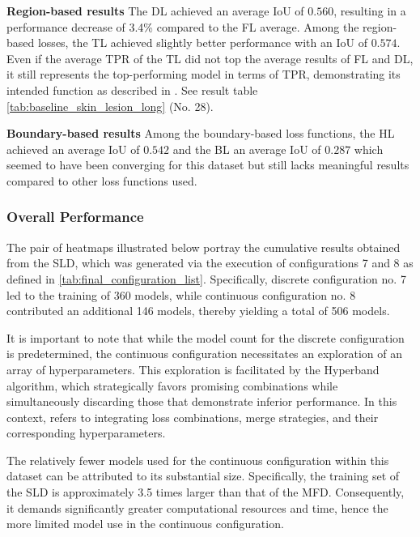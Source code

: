 \textbf{Region-based results}\newline
The \ac{DL} achieved an average \ac{IoU} of $0.560$, resulting in a performance decrease of 3.4\% compared to the \ac{FL} average. Among the region-based losses, the \ac{TL} achieved slightly better performance with an \ac{IoU} of $0.574$. Even if the average \ac{TPR} of the \ac{TL} did not top the average results of \ac{FL} and \ac{DL}, it still represents the top-performing model in terms of \ac{TPR}, demonstrating its intended function as described in \cite{DBLP:journals/corr/SalehiEG17a}. See result table \ref{tab:baseline_skin_lesion_long} (No. 28).

\textbf{Boundary-based results}\newline
Among the boundary-based loss functions, the \ac{HL} achieved an average \ac{IoU} of $0.542$ and the \ac{BL} an average \ac{IoU} of $0.287$ which seemed to have been converging for this dataset but still lacks meaningful results compared to other loss functions used.



\subsubsection*{Overall Performance}
\label{subsubsec:skin_lesion_overall_performance}
The pair of heatmaps illustrated below portray the cumulative results obtained from the \ac{SLD}, which was generated via the execution of configurations 7 and 8 as defined in \ref{tab:final_configuration_list}. Specifically, discrete configuration no. 7 led to the training of 360 models, while continuous configuration no. 8 contributed an additional 146 models, thereby yielding a total of 506 models.

It is important to note that while the model count for the discrete configuration is predetermined, the continuous configuration necessitates an exploration of an array of hyperparameters. This exploration is facilitated by the Hyperband algorithm, which strategically favors promising combinations while simultaneously discarding those that demonstrate inferior performance. In this context,  refers to integrating loss combinations, merge strategies, and their corresponding hyperparameters.

The relatively fewer models used for the continuous configuration within this dataset can be attributed to its substantial size. Specifically, the training set of the \ac{SLD} is approximately 3.5 times larger than that of the \ac{MFD}. Consequently, it demands significantly greater computational resources and time, hence the more limited model use in the continuous configuration.

